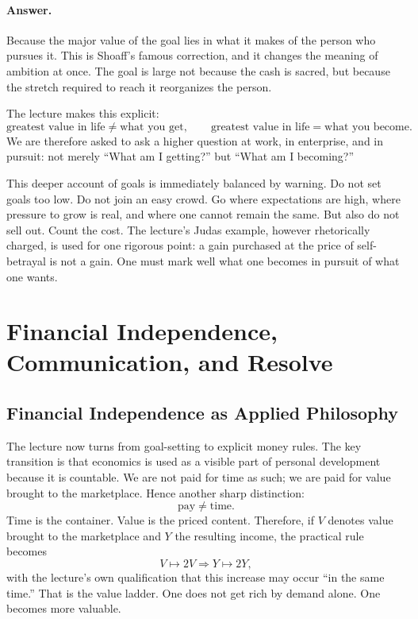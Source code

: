 \paragraph{Answer.} Because the major value of the goal lies in what it makes of the person who pursues it. This is Shoaff's famous correction, and it changes the meaning of ambition at once. The goal is large not because the cash is sacred, but because the stretch required to reach it reorganizes the person.

The lecture makes this explicit:
\begin{equation}
\text{greatest value in life} \neq \text{what you get},
\qquad
\text{greatest value in life} = \text{what you become}.
\end{equation}
We are therefore asked to ask a higher question at work, in enterprise, and in pursuit: not merely ``What am I getting?'' but ``What am I becoming?''

This deeper account of goals is immediately balanced by warning. Do not set goals too low. Do not join an easy crowd. Go where expectations are high, where pressure to grow is real, and where one cannot remain the same. But also do not sell out. Count the cost. The lecture's Judas example, however rhetorically charged, is used for one rigorous point: a gain purchased at the price of self-betrayal is not a gain. One must mark well what one becomes in pursuit of what one wants.

\section{Financial Independence, Communication, and Resolve}

\subsection{Financial Independence as Applied Philosophy}

The lecture now turns from goal-setting to explicit money rules. The key transition is that economics is used as a visible part of personal development because it is countable. We are not paid for time as such; we are paid for value brought to the marketplace. Hence another sharp distinction:
\begin{equation}
\text{pay} \neq \text{time}.
\end{equation}
Time is the container. Value is the priced content. Therefore, if \(V\) denotes value brought to the marketplace and \(Y\) the resulting income, the practical rule becomes
\begin{equation}
V \mapsto 2V \Rightarrow Y \mapsto 2Y,
\end{equation}
with the lecture's own qualification that this increase may occur ``in the same time.'' That is the value ladder. One does not get rich by demand alone. One becomes more valuable.

